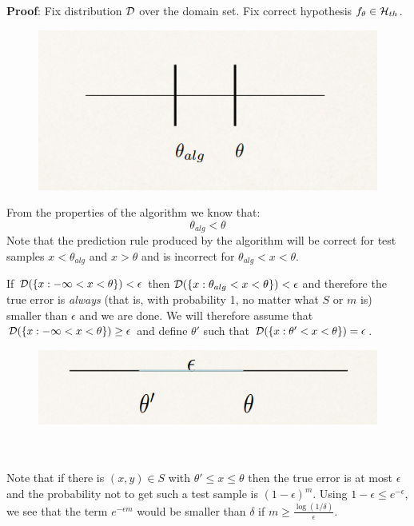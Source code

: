 \textbf{Proof}:
Fix distribution $\mathcal{D}$ over the domain set. Fix correct hypothesis $f_{\theta}\in \mathcal{H}_{th}$.

\begin{figure}[h!]
\centering
\includegraphics[scale=0.3]{thresholds3.png}
\end{figure}


From the properties of the algorithm we know that:
$$\theta_{alg} < \theta$$
Note that the prediction rule produced by the algorithm will be correct for test samples $x<\theta_{alg}$ and $x>\theta$ and is incorrect for $\theta_{alg}<x<\theta$.

\vspace{5mm}

If $\mathcal{D}(\{x: -\infty < x < \theta\})<\epsilon$  then $\mathcal{D}(\{x: \theta_{alg} < x < \theta\})<\epsilon$  and therefore the true error is \textit{always} (that is, with probability 1, no matter what $S$ or $m$ is) smaller than $\epsilon$ and we are done. We will therefore assume that $\mathcal{D}(\{x: -\infty < x < \theta\})\geq \epsilon$  and define $\theta'$ such that $\mathcal{D}(\{x: \theta' < x < \theta\})=\epsilon$.
\begin{figure}[h!]
\centering
\includegraphics[scale=0.3]{thresholds4.png}
\end{figure}
\\~\\
Note that if there is $(x, y)\in S$ with $\theta'\leq x\leq\theta$ then the true error is at most $\epsilon$ and the probability not to get such a test sample is $(1-\epsilon)^m$.
Using  $1-\epsilon \le e^{-\epsilon}$, we see that the term $e^{-\epsilon m}$ would be smaller than $\delta$ if $m \ge  \frac{\log(1/\delta)}{\epsilon}$.


